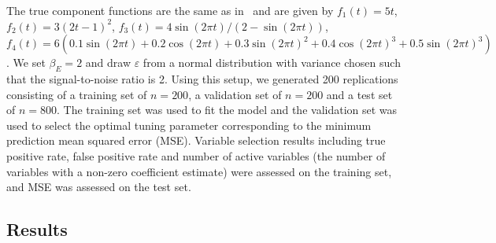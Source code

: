 \documentclass[a4paper,fleqn]{cas-sc}
\begin{document}
The true component functions are the same as in~\citep{lin2006component,huang2010variable} and are given by $f_1(t) = 5t$, $f_2(t) = 3(2t-1)^2$, $f_3(t) = 4\sin(2\pi t) / (2-\sin(2\pi t))$, $f_4(t) = 6(0.1\sin(2\pi t) + 0.2 \cos(2\pi t)  + 0.3 \sin(2\pi t)^2 + 0.4\cos(2\pi t)^3+0.5\sin(2\pi t)^3)$. We set $\beta_E = 2$ and draw $\varepsilon$ from a normal distribution with variance chosen such that the signal-to-noise ratio is 2. Using this setup, we generated 200 replications consisting of a training set of $n=200$, a validation set of $n=200$ and a test set of $n=800$. The training set was used to fit the model and the validation set was used to select the optimal tuning parameter corresponding to the minimum prediction mean squared error (MSE). Variable selection results including true positive rate, false positive rate and number of active variables (the number of variables with a non-zero coefficient estimate) were assessed on the training set, and MSE was assessed on the test set. %

\subsection{Results}

%
%
%
\end{document}
